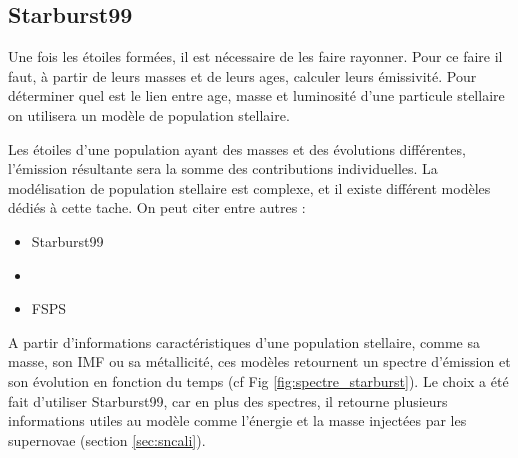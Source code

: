 \subsection{Starburst99}
\label{sec:staburst}

Une fois les étoiles formées, il est nécessaire de les faire rayonner.
Pour ce faire il faut, à partir de leurs masses et de leurs ages, calculer leurs émissivité.
Pour déterminer quel est le lien entre age, masse et luminosité d'une particule stellaire on utilisera un modèle de population stellaire.


Les étoiles d'une population ayant des masses et des évolutions différentes, l'émission résultante sera la somme des contributions individuelles.
La modélisation de population stellaire est complexe, et il existe différent modèles dédiés à cette tache.
On peut citer entre autres :

\begin{itemize}
\item Starburst99 \cite{leitherer_starburst99:_1999} 
\item \cite{2003MNRAS.344.1000B}
\item FSPS \cite{2009ApJ...699..486C}
\end{itemize}

A partir d'informations caractéristiques d'une population stellaire, comme sa masse, son \ac{IMF} ou sa métallicité, ces modèles retournent un spectre d'émission et son évolution en fonction du temps (cf Fig \ref{fig:spectre_starburst}).
Le choix a été fait d'utiliser Starburst99, car en plus des spectres, il retourne plusieurs informations utiles au modèle comme l'énergie et la masse injectées par les supernovae (section \ref{sec:sncali}).

